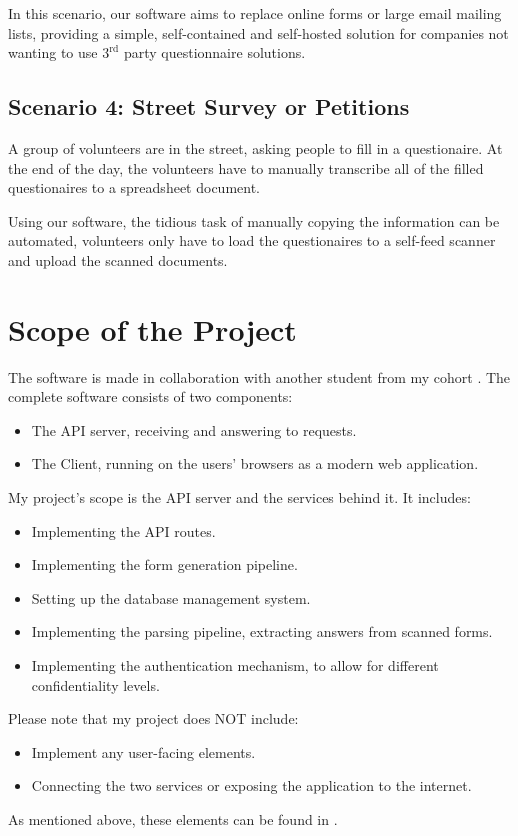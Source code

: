\documentclass[11pt, a4paper]{report}
\begin{document}
In this scenario, our software aims to replace online forms or large email mailing lists, providing a simple, self-contained and self-hosted solution for companies not wanting to use $3^\textrm{rd}$ party questionnaire solutions.

\subsection*{Scenario 4: Street Survey or Petitions}

A group of volunteers are in the street, asking people to fill in a questionaire. At the end of the day, the volunteers have to manually transcribe all of the filled questionaires to a spreadsheet document.

Using our software, the tidious task of manually copying the information can be automated, volunteers only have to load the questionaires to a self-feed scanner and upload the scanned documents.

\section{Scope of the Project}

The software is made in collaboration with another student from my cohort \cite{felix}.
The complete software consists of two components:
\begin{itemize}
    \item The API server, receiving and answering to requests.
    \item The Client, running on the users' browsers as a modern web application.
\end{itemize}
My project's scope is the API server and the services behind it. It includes:
\begin{itemize}
    \item Implementing the API routes.
    \item Implementing the form generation pipeline.
    \item Setting up the database management system.
    \item Implementing the parsing pipeline, extracting answers from scanned forms.
    \item Implementing the authentication mechanism, to allow for different confidentiality levels.
\end{itemize}
Please note that my project does NOT include:
\begin{itemize}
    \item Implement any user-facing elements.
    \item Connecting the two services or exposing the application to the internet.
\end{itemize}
As mentioned above, these elements can be found in \cite{felix}.
\end{document}
